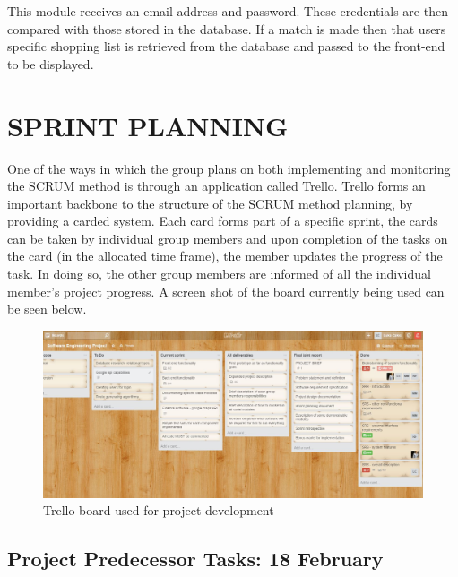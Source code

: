\documentclass[10pt,twocolumn]{witseiepaper}
\begin{document}
		This module receives an email address and password. These credentials are then compared with those stored in the database. If a match is made then that users specific shopping list is retrieved from the database and passed to the front-end to be displayed.
		

\section{SPRINT PLANNING}

	One of the ways in which the group plans on both implementing and monitoring the SCRUM method is through an application called Trello. Trello forms an important backbone to the structure of the SCRUM method planning, by providing a carded system. Each card forms part of a specific sprint, the cards can be taken by individual group members and upon completion of the tasks on the card (in the allocated time frame), the member updates the progress of the task. In doing so, the other group members are informed of all the individual member's project progress. A screen shot of the board currently being used can be seen below. 
	
	\begin{figure}[h!]
		\centering
		\includegraphics[width = \columnwidth]{../images/Trello.JPG}
		\caption{Trello board used for project development}
		\label{trello}
	\end{figure}
	
	\subsection{Project Predecessor Tasks: 18 February}
	
\end{document}
